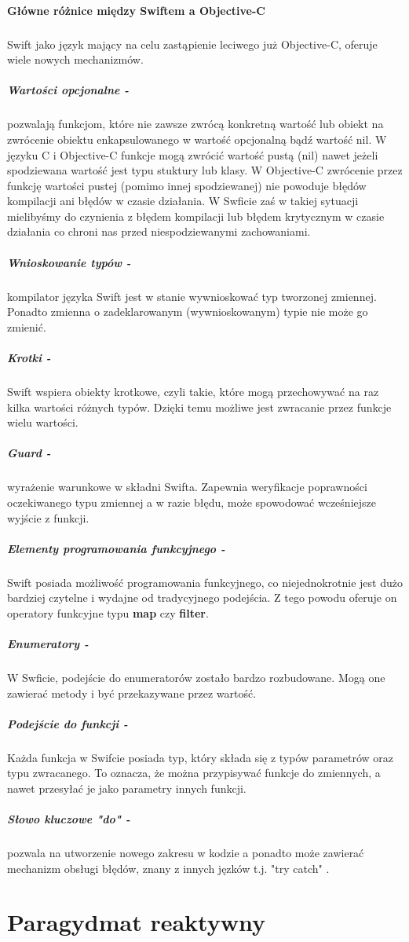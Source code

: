 \documentclass[12pt,oneside,a4paper]{report}
\begin{document}
\paragraph{Główne różnice między Swiftem a Objective-C}
\subparagraph{}Swift jako język mający na celu zastąpienie leciwego już Objective-C, oferuje wiele nowych mechanizmów.
\subparagraph{Wartości opcjonalne - } pozwalają funkcjom, które nie zawsze zwrócą konkretną wartość lub obiekt na zwrócenie obiektu enkapsulowanego w wartość opcjonalną bądź wartość nil. W języku C i Objective-C funkcje mogą zwrócić wartość pustą (nil) nawet jeżeli spodziewana wartość jest typu stuktury lub klasy. W Objective-C zwrócenie przez funkcję wartości pustej (pomimo innej spodziewanej) nie powoduje błędów kompilacji ani błędów w czasie działania. W Swficie zaś w takiej sytuacji mielibyśmy do czynienia z błędem kompilacji lub błędem krytycznym w czasie działania co chroni nas przed niespodziewanymi zachowaniami.
\subparagraph{Wnioskowanie typów - } kompilator języka Swift jest w stanie wywnioskować typ tworzonej zmiennej. Ponadto zmienna o zadeklarowanym (wywnioskowanym) typie nie może go zmienić.
\subparagraph{Krotki - } Swift wspiera obiekty krotkowe, czyli takie, które mogą przechowywać na raz kilka wartości różnych typów. Dzięki temu możliwe jest zwracanie przez funkcje wielu wartości.
\subparagraph{Guard - } wyrażenie warunkowe w składni Swifta. Zapewnia weryfikacje poprawności oczekiwanego typu zmiennej a w razie błędu, może spowodować wcześniejsze wyjście z funkcji.
\subparagraph{Elementy programowania funkcyjnego - } Swift posiada możliwość programowania funkcyjnego, co niejednokrotnie jest dużo bardziej czytelne i wydajne od tradycyjnego podejścia. Z tego powodu oferuje on operatory funkcyjne typu \textbf{map} czy \textbf{filter}.       
\subparagraph{Enumeratory - } W Swficie, podejście do enumeratorów zostało bardzo rozbudowane. Mogą one zawierać metody i być przekazywane przez wartość.
\subparagraph{Podejście do funkcji - } Każda funkcja w Swifcie posiada typ, który składa się z typów parametrów oraz typu zwracanego. To oznacza, że można przypisywać funkcje do zmiennych, a nawet przesyłać je jako parametry innych funkcji.
\subparagraph{Słowo kluczowe "do" - } pozwala na utworzenie nowego zakresu w kodzie a ponadto może zawierać mechanizm obsługi błędów, znany z innych jęzków t.j. "try catch" \cite{swiftObjcDiff}.
\section{Paragydmat reaktywny}
\end{document}
